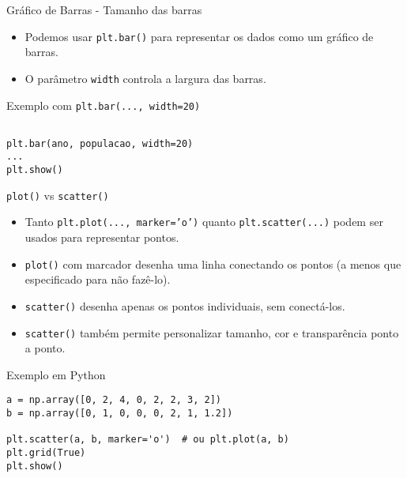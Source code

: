 \begin{frame}[fragile]{Gráfico de Barras - Tamanho das barras}
    \begin{itemize}
        \item Podemos usar \texttt{plt.bar()} para representar os dados como um gráfico de barras.
        \item O parâmetro \texttt{width} controla a largura das barras.
    \end{itemize}

    \begin{block}{Exemplo com \texttt{plt.bar(..., width=20)}}
\begin{verbatim}

plt.bar(ano, populacao, width=20)
...
plt.show()
\end{verbatim}
    \end{block}
\end{frame}

\begin{frame}[fragile]{\texttt{plot()} vs \texttt{scatter()}}
    \begin{itemize}
        \item Tanto \texttt{plt.plot(..., marker='o')} quanto \texttt{plt.scatter(...)} podem ser usados para representar pontos.
        \item \texttt{plot()} com marcador desenha uma linha conectando os pontos (a menos que especificado para não fazê-lo).
        \item \texttt{scatter()} desenha apenas os pontos individuais, sem conectá-los.
        \item \texttt{scatter()} também permite personalizar tamanho, cor e transparência ponto a ponto.
    \end{itemize}

    \begin{block}{Exemplo em Python}
\begin{verbatim}
a = np.array([0, 2, 4, 0, 2, 2, 3, 2])
b = np.array([0, 1, 0, 0, 0, 2, 1, 1.2])

plt.scatter(a, b, marker='o')  # ou plt.plot(a, b)
plt.grid(True)
plt.show()
\end{verbatim}
    \end{block}
\end{frame}

